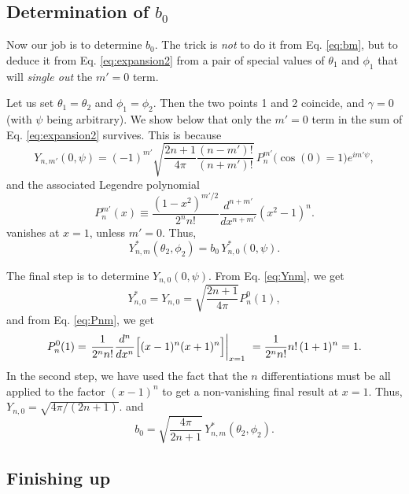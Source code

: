 \documentclass[11pt]{article}
\begin{document}
\subsection{Determination of $b_0$}


Now our job is to determine $b_0$.
The trick is \emph{not} to do it from Eq. \eqref{eq:bm},
but to deduce it from Eq. \eqref{eq:expansion2}
from a pair of special values of $\theta_1$ and $\phi_1$
that will \emph{single out} the $m' = 0$ term.

Let us set $\theta_1 = \theta_2$ and $\phi_1 = \phi_2$.
Then the two points 1 and 2 coincide,
and $\gamma = 0$ (with $\psi$ being arbitrary).
%
We show below that only the $m' = 0$ term in the sum
of Eq. \eqref{eq:expansion2} survives.
%
This is because
\begin{equation}
  Y_{n, m'}(0, \psi)
=
  (-1)^{m'}
  \sqrt{
    \frac{ 2 n + 1 } { 4 \pi }
    \frac{ (n - m')! } { (n + m')! }
  }
  \,
  P_{n}^{m'}\bigl( \cos(0) = 1 \bigr) e^{i m' \psi},
  \label{eq:Ynm}
\end{equation}
and the associated Legendre polynomial
\begin{equation}
  P_{n}^{m'}(x)
\equiv
  \frac{ (1 - x^2)^{m'/2} } { 2^{n} n! }
  \frac{ d^{n+m'} } { d x^{n+m'} } (x^2 - 1)^{n}.
  \label{eq:Pnm}
\end{equation}
vanishes at $x = 1$, unless $m' = 0$.
Thus,
\[
Y_{n,m}^*(\theta_2, \phi_2)
=
b_0 \, Y_{n, 0}^*(0, \psi).
\]

The final step is to determine $Y_{n, 0}(0, \psi)$.
From Eq. \eqref{eq:Ynm}, we get
\[
  Y_{n, 0}^*
=
  Y_{n, 0}
=
  \sqrt{
    \frac { 2 n + 1 } { 4 \pi }
  }
  P_{n}^0(1),
\]
and
from Eq. \eqref{eq:Pnm}, we get
\[
  P_{n}^{0}(1)
=
  \left.
  \frac{ 1 } { 2^{n} n! }
  \frac{ d^{n} } { d x^{n} }
  \Bigl[
    (x - 1)^{n}
    (x + 1)^{n}
  \Bigr]
  \right|_{x = 1}\
= \frac{ 1 } { 2^{n} n! }
  n! \, (1 + 1)^n
= 1.
\]
In the second step,
we have used the fact that
the $n$ differentiations must be
all applied to the factor $(x - 1)^n$
to get a non-vanishing final result at $x = 1$.
%
Thus,
$Y_{n, 0} = \sqrt{4\pi/(2n+1)}$.
and
\begin{equation}
b_0 = \sqrt{ \frac {4 \pi} { 2 n + 1 } } \, Y_{n,m}^*(\theta_2, \phi_2).
\label{eq:b0}
\end{equation}



\subsection{Finishing up}
\end{document}
